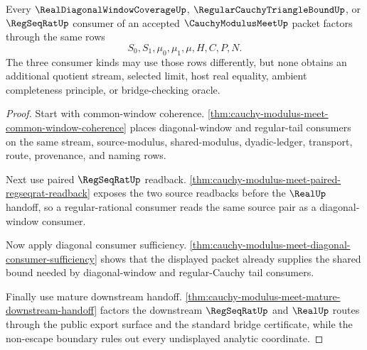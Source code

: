 \begin{theorem}
\label{thm:cauchy-modulus-meet-regular-limit-consumer-triad}
Every $\RealDiagonalWindowCoverageUp$, $\RegularCauchyTriangleBoundUp$, or $\RegSeqRatUp$ consumer of an accepted $\CauchyModulusMeetUp$ packet factors through the same rows
$$
S_0,S_1,\mu_0,\mu_1,\mu,H,C,P,N.
$$
The three consumer kinds may use those rows differently, but none obtains an additional quotient stream, selected limit, host real equality, ambient completeness principle, or bridge-checking oracle.
\end{theorem}
\begin{proof}
Start with common-window coherence. \autoref{thm:cauchy-modulus-meet-common-window-coherence} places diagonal-window and regular-tail consumers on the same stream, source-modulus, shared-modulus, dyadic-ledger, transport, route, provenance, and naming rows.

Next use paired $\RegSeqRatUp$ readback. \autoref{thm:cauchy-modulus-meet-paired-regseqrat-readback} exposes the two source readbacks before the $\RealUp$ handoff, so a regular-rational consumer reads the same source pair as a diagonal-window consumer.

Now apply diagonal consumer sufficiency. \autoref{thm:cauchy-modulus-meet-diagonal-consumer-sufficiency} shows that the displayed packet already supplies the shared bound needed by diagonal-window and regular-Cauchy tail consumers.

Finally use mature downstream handoff. \autoref{thm:cauchy-modulus-meet-mature-downstream-handoff} factors the downstream $\RegSeqRatUp$ and $\RealUp$ routes through the public export surface and the standard bridge certificate, while the non-escape boundary rules out every undisplayed analytic coordinate.
\end{proof}

